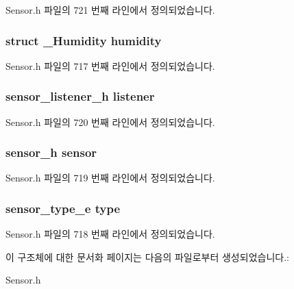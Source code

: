 Sensor.\-h 파일의 721 번째 라인에서 정의되었습니다.

\hypertarget{struct__HumidityExtend_aeae7c9d5a8189e24f5e832b83559896f}{
\subsubsection[{humidity}]{\setlength{\rightskip}{0pt plus 5cm}struct {\bf \-\_\-\-Humidity} humidity}}\label{struct__HumidityExtend_aeae7c9d5a8189e24f5e832b83559896f}


Sensor.\-h 파일의 717 번째 라인에서 정의되었습니다.

\hypertarget{struct__HumidityExtend_aa977dfb866b24fd7d9a20a9a01b2fd1f}{
\subsubsection[{listener}]{\setlength{\rightskip}{0pt plus 5cm}sensor\-\_\-listener\-\_\-h listener}}\label{struct__HumidityExtend_aa977dfb866b24fd7d9a20a9a01b2fd1f}


Sensor.\-h 파일의 720 번째 라인에서 정의되었습니다.

\hypertarget{struct__HumidityExtend_a5bae9b7801bc3808411925cde81d3f26}{
\subsubsection[{sensor}]{\setlength{\rightskip}{0pt plus 5cm}sensor\-\_\-h sensor}}\label{struct__HumidityExtend_a5bae9b7801bc3808411925cde81d3f26}


Sensor.\-h 파일의 719 번째 라인에서 정의되었습니다.

\hypertarget{struct__HumidityExtend_abffb09766da2fc510a79bb51f82a36e1}{
\subsubsection[{type}]{\setlength{\rightskip}{0pt plus 5cm}sensor\-\_\-type\-\_\-e type}}\label{struct__HumidityExtend_abffb09766da2fc510a79bb51f82a36e1}


Sensor.\-h 파일의 718 번째 라인에서 정의되었습니다.



이 구조체에 대한 문서화 페이지는 다음의 파일로부터 생성되었습니다.\-:\begin{DoxyCompactItemize}
\item 
Sensor.\-h\end{DoxyCompactItemize}

